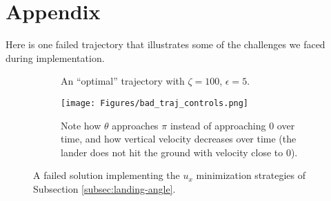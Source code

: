 \documentclass{article}
\begin{document}
\newpage
\nocite{*}



\newpage
\section{Appendix}
Here is one failed trajectory that illustrates some of the challenges we faced during implementation.

\begin{figure}[h]
    \label{fig:appendix}
    \centering
    \begin{subfigure}{0.45\textwidth}
        \centering
        \caption{An ``optimal'' trajectory with $\zeta=100$, $\epsilon = 5$.}
        \label{fig:bad_trajectory}
    \end{subfigure}
    \hfill
    \begin{subfigure}{0.45\textwidth}
        \centering
        \texttt{[image: Figures/bad\_traj\_controls.png]}
        \caption{Note how $\theta$ approaches $\pi$ instead of approaching 0 over time, and how vertical velocity decreases over time (the lander does not hit the ground with velocity close to 0).}
        \label{fig:badder_controls}
    \end{subfigure}
    \caption{A failed solution implementing the $u_x$ minimization strategies of Subsection \ref{subsec:landing-angle}.}
\end{figure}
\end{document}
